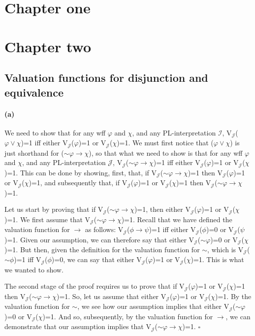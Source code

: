 \documentclass[sloppy, journal, git, bytitle]{humapap}
\begin{document}
\documenttitle

\section{Chapter one}
\section{Chapter two}
\subsection{Valuation functions for disjunction and equivalence}
\paragraph{(a)} We need to show that for any wff $\varphi$ and $\chi$, 
and any PL-interpretation $\mathcal{I}$, 
V$\mathcal{_J}$($\varphi\vee\chi$)=1 iff either V$\mathcal{_J}$($\varphi$)=1 or V$\mathcal{_J}$($\chi$)=1. 
We must first notice that ($\varphi \vee \chi$) is just shorthand for ($\sim\varphi\rightarrow\chi$), 
so that what we need to show is that for any wff $\varphi$ and $\chi$, 
and any PL-interpretation $\mathcal{J}$, V$\mathcal{_J}$($\sim\varphi\rightarrow\chi$)=1 iff either V$\mathcal{_J}$($\varphi$)=1 or V$\mathcal{_J}$($\chi$)=1. 
This can be done by showing, first, that, 
if V$\mathcal{_J}$($\sim\varphi\rightarrow\chi$)=1 then V$\mathcal{_J}$($\varphi$)=1 or V$\mathcal{_J}$($\chi$)=1, 
and subsequently that, if V$\mathcal{_J}$($\varphi$)=1 or V$\mathcal{_J}$($\chi$)=1 then V$\mathcal{_J}$($\sim\varphi \rightarrow\chi$)=1.

Let us start by proving that if V$\mathcal{_J}$($\sim\varphi\rightarrow\chi$)=1, 
then either V$\mathcal{_J}$($\varphi$)=1 or V$\mathcal{_J}$($\chi$)=1. 
We first assume that V$\mathcal{_J}$($\sim\varphi\rightarrow\chi$)=1. 
Recall that we have defined the valuation function for $\rightarrow$ as follows: 
V$\mathcal{_J}$($\phi\rightarrow\psi$)=1 iff either V$\mathcal{_J}$($\phi$)=0 or V$\mathcal{_J}$($\psi$)=1. 
Given our assumption, we can therefore say that either V$\mathcal{_J}$($\sim\varphi$)=0 or V$\mathcal{_J}$($\chi$)=1. 
But then, given the definition for the valuation function for $\sim$, 
which is V$\mathcal{_J}$($\sim\phi$)=1 iff V$\mathcal{_J}$($\phi$)=0, 
we can say that either V$\mathcal{_J}$($\varphi$)=1 or V$\mathcal{_J}$($\chi$)=1. 
This is what we wanted to show.

The second stage of the proof requires us to prove that 
if V$\mathcal{_J}$($\varphi$)=1 or V$\mathcal{_J}$($\chi$)=1 then V$\mathcal{_J}$($\sim\varphi\rightarrow\chi$)=1. 
So, let us assume that either V$\mathcal{_J}$($\varphi$)=1 or V$\mathcal{_J}$($\chi$)=1. 
By the valuation function for $\sim$, 
we see how our assumption implies that either  V$\mathcal{_J}$($\sim\varphi$)=0 or V$\mathcal{_J}$($\chi$)=1. 
And so, subsequently, by the valuation function for $\rightarrow$, 
we can demonstrate that our assumption implies that V$\mathcal{_J}$($\sim\varphi\rightarrow\chi$)=1. $\square$
\end{document}
